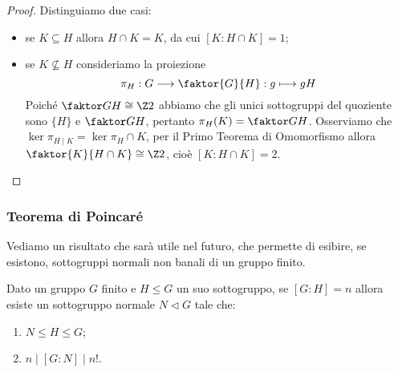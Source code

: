 \documentclass[11pt]{scrartcl}
\begin{document}
\begin{proof}
    Distinguiamo due casi:
    \begin{itemize}
        \item se $K \subseteq H$ allora $H \cap K = K$, da cui $[K:H\cap K] = 1$;
        \item se $K \nsubseteq H$ consideriamo la proiezione 
        \[
            \pi_H: G\longrightarrow \faktor{G}{H} :g \longmapsto gH
        \]
        Poiché $\faktor G H \cong \Z2$ abbiamo che gli unici sottogruppi 
        del quoziente sono $\{H\}$ e $\faktor G H$, pertanto 
        $\pi_H(K) = \faktor G H$. Osserviamo che $\ker\pi_{H\mid K}
        = \ker \pi_H \cap K$, per il Primo Teorema di Omomorfismo allora 
        $\faktor{K}{H\cap K} \cong \Z2$, cioè $[K:H\cap K] = 2$.
    \end{itemize}
\end{proof}

\subsubsection{Teorema di Poincaré}

Vediamo un risultato che sarà utile nel futuro, che permette di esibire,
se esistono, sottogruppi normali non banali di un gruppo finito.

\begin{theorem}
    \label{teorema1.50}
    Dato un gruppo $G$ finito e $H\leqslant G$ un suo sottogruppo, 
    se $[G:H] = n$ allora esiste un sottogruppo normale $N\triangleleft G$ 
    tale che:
    \begin{enumerate}[(1)]
        \item $N\leqslant H \leqslant G$;
        \item $n \mid [G:N] \mid n!$.
    \end{enumerate}
\end{theorem}
\end{document}
